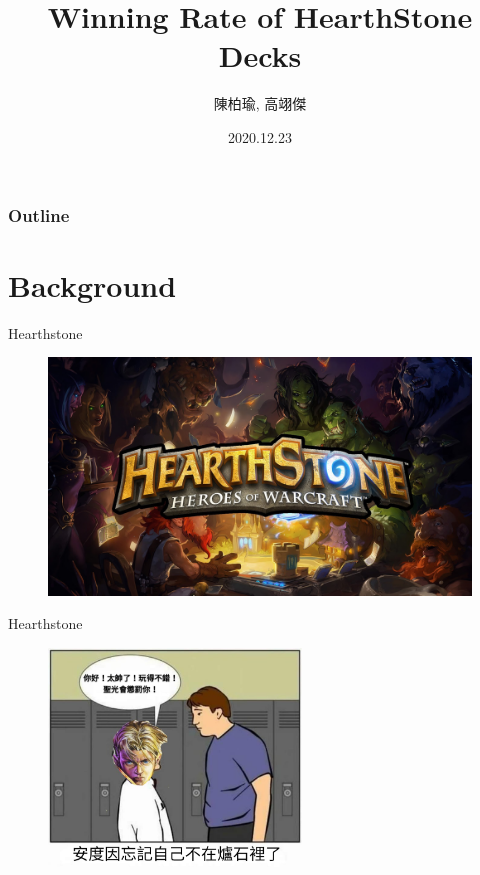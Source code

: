 \documentclass[12pt]{beamer}
\title{Winning Rate of HearthStone Decks}
\author{陳柏瑜, 高翊傑}
\institute[NTU Econ]{\scshape ccClub2020 Fall\\ NTU Econ}
\date{2020.12.23}
\begin{document}
\begin{frame}
\titlepage
\end{frame}

\begin{frame}
\frametitle{Outline}
\tableofcontents
\end{frame}


\section{Background} 

\begin{frame}[fragile]{Hearthstone}

	\begin{figure}
		\begin{center}
			\includegraphics[width=1\textwidth]{figure/f01.jpg}
		\end{center}
	\end{figure}

\end{frame}



\begin{frame}[fragile]{Hearthstone}

	\begin{figure}
		\begin{center}
			\includegraphics[width=0.6\textwidth]{figure/f02-1.png}
		\end{center}
	\end{figure}

\end{frame}
\end{document}
